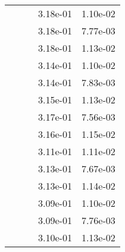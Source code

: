 \begin{table}
\begin{tabular}{c|cc|cc|}
\multicolumn{1}{|c|}{} & \multicolumn{1}{|c|}{} & \multicolumn{1}{|c|}{} & \multicolumn{1}{|c|}{  3.18e-01} & \multicolumn{1}{|c|}{  1.10e-02} \\ 
\multicolumn{1}{|c|}{} & \multicolumn{1}{|c|}{} & \multicolumn{1}{|c|}{} & \multicolumn{1}{|c|}{  3.18e-01} & \multicolumn{1}{|c|}{  7.77e-03} \\ 
\multicolumn{1}{|c|}{} & \multicolumn{1}{|c|}{} & \multicolumn{1}{|c|}{} & \multicolumn{1}{|c|}{  3.18e-01} & \multicolumn{1}{|c|}{  1.13e-02} \\ 
\multicolumn{1}{|c|}{} & \multicolumn{1}{|c|}{} & \multicolumn{1}{|c|}{} & \multicolumn{1}{|c|}{  3.14e-01} & \multicolumn{1}{|c|}{  1.10e-02} \\ 
\multicolumn{1}{|c|}{} & \multicolumn{1}{|c|}{} & \multicolumn{1}{|c|}{} & \multicolumn{1}{|c|}{  3.14e-01} & \multicolumn{1}{|c|}{  7.83e-03} \\ 
\multicolumn{1}{|c|}{} & \multicolumn{1}{|c|}{} & \multicolumn{1}{|c|}{} & \multicolumn{1}{|c|}{  3.15e-01} & \multicolumn{1}{|c|}{  1.13e-02} \\ 
\multicolumn{1}{|c|}{} & \multicolumn{1}{|c|}{} & \multicolumn{1}{|c|}{} & \multicolumn{1}{|c|}{  3.17e-01} & \multicolumn{1}{|c|}{  7.56e-03} \\ 
\multicolumn{1}{|c|}{} & \multicolumn{1}{|c|}{} & \multicolumn{1}{|c|}{} & \multicolumn{1}{|c|}{  3.16e-01} & \multicolumn{1}{|c|}{  1.15e-02} \\ 
\multicolumn{1}{|c|}{} & \multicolumn{1}{|c|}{} & \multicolumn{1}{|c|}{} & \multicolumn{1}{|c|}{  3.11e-01} & \multicolumn{1}{|c|}{  1.11e-02} \\ 
\multicolumn{1}{|c|}{} & \multicolumn{1}{|c|}{} & \multicolumn{1}{|c|}{} & \multicolumn{1}{|c|}{  3.13e-01} & \multicolumn{1}{|c|}{  7.67e-03} \\ 
\multicolumn{1}{|c|}{} & \multicolumn{1}{|c|}{} & \multicolumn{1}{|c|}{} & \multicolumn{1}{|c|}{  3.13e-01} & \multicolumn{1}{|c|}{  1.14e-02} \\ 
\multicolumn{1}{|c|}{} & \multicolumn{1}{|c|}{} & \multicolumn{1}{|c|}{} & \multicolumn{1}{|c|}{  3.09e-01} & \multicolumn{1}{|c|}{  1.10e-02} \\ 
\multicolumn{1}{|c|}{} & \multicolumn{1}{|c|}{} & \multicolumn{1}{|c|}{} & \multicolumn{1}{|c|}{  3.09e-01} & \multicolumn{1}{|c|}{  7.76e-03} \\ 
\multicolumn{1}{|c|}{} & \multicolumn{1}{|c|}{} & \multicolumn{1}{|c|}{} & \multicolumn{1}{|c|}{  3.10e-01} & \multicolumn{1}{|c|}{  1.13e-02} \\ 

\end{tabular}
\end{table}
